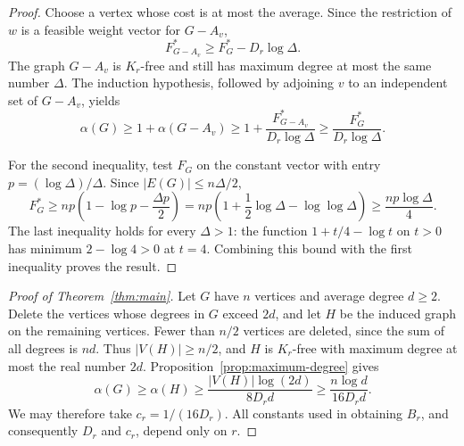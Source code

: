 \begin{proof}
Choose a vertex whose cost is at most the average.  Since the restriction
of $w$ is a feasible weight vector for $G-A_v$,
\[
 F_{G-A_v}^*\ge F_G^*-D_r\log\Delta.
\]
The graph $G-A_v$ is $K_r$-free and still has maximum degree at most the
same number $\Delta$.  The induction hypothesis, followed by adjoining
$v$ to an independent set of $G-A_v$, yields
\[
 \alpha(G)\ge 1+\alpha(G-A_v)
 \ge 1+\frac{F_{G-A_v}^*}{D_r\log\Delta}
 \ge \frac{F_G^*}{D_r\log\Delta}.
\]

For the second inequality, test $F_G$ on the constant vector with entry
$p=(\log\Delta)/\Delta$.  Since $|E(G)|\le n\Delta/2$,
\[
 F_G^*\ge np\left(1-\log p-\frac{\Delta p}{2}\right)
 =np\left(1+\frac12\log\Delta-\log\log\Delta\right)
 \ge \frac{np\log\Delta}{4}.
\]
The last inequality holds for every $\Delta>1$: the function
$1+t/4-\log t$ on $t>0$ has minimum $2-\log4>0$ at $t=4$.
Combining this bound with the first inequality proves the result.
\end{proof}

\begin{proof}[Proof of Theorem~\ref{thm:main}]
Let $G$ have $n$ vertices and average degree $d\ge2$.  Delete the vertices
whose degrees in $G$ exceed $2d$, and let $H$ be the induced graph on
the remaining vertices.  Fewer than $n/2$ vertices are deleted, since
the sum of all degrees is $nd$.  Thus $|V(H)|\ge n/2$, and
$H$ is $K_r$-free with maximum degree at most the real number $2d$.
Proposition~\ref{prop:maximum-degree} gives
\[
 \alpha(G)\ge\alpha(H)
 \ge\frac{|V(H)|\log(2d)}{8D_r d}
 \ge\frac{n\log d}{16D_r d}.
\]
We may therefore take $c_r=1/(16D_r)$.
All constants used in obtaining $B_r$, and consequently $D_r$ and $c_r$,
depend only on $r$.
\end{proof}
